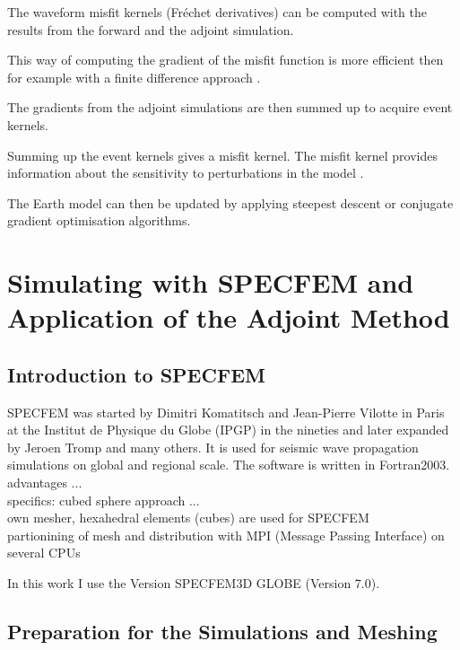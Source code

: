 The waveform misfit kernels (Fr\'{e}chet derivatives) can be computed with the results from the forward and the adjoint simulation. 

This way of computing the gradient of the misfit function is more efficient then for example with a finite difference 
approach \citep{Fichtner2006a}.


 
The gradients from the adjoint simulations are then summed up to acquire event kernels. %

Summing up the event kernels gives a misfit kernel. The misfit kernel provides information about the sensitivity to perturbations in the model \citep{Magnoni2012}.

The Earth model can then be updated by applying steepest descent or conjugate gradient optimisation algorithms. 




\section{Simulating with SPECFEM and Application of the Adjoint Method}

\subsection{Introduction to SPECFEM}

SPECFEM \cite{Vilotte1998} was started by Dimitri Komatitsch and Jean-Pierre Vilotte in Paris at the Institut de Physique du Globe (IPGP) in the nineties 
and later expanded by Jeroen Tromp and many others. 
It is used for seismic wave propagation simulations on global and regional scale. 
The software is written in Fortran2003. \\
advantages ... \\
specifics: cubed sphere approach ... \\
own mesher, hexahedral elements (cubes) are used for SPECFEM \\
partionining of mesh and distribution with MPI (Message Passing Interface) on several CPUs 

In this work I use the Version SPECFEM3D GLOBE (Version 7.0). 


\subsection{Preparation for the Simulations and Meshing}

